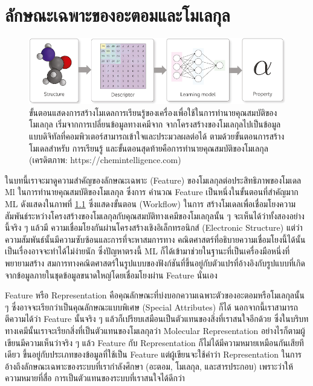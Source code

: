 

\chapter{ลักษณะเฉพาะของอะตอมและโมเลกุล}
\label{ch:feature}

\begin{figure}[htbp]
    \centering
    \includegraphics[width=\linewidth]{fig/workflow_chem_ml.png}
    \caption{ขั้นตอนแสดงการสร้างโมเดลการเรียนรู้ของเครื่องเพื่อใช้ในการทำนายคุณสมบัติของโมเลกุล เริ่มจากการเปลี่ยนข้อมูลทางเคมีจาก%
    จากโครงสร้างของโมเลกุลไปเป็นข้อมูลแบบดิจิทัลที่คอมพิวเตอร์สามารถเข้าใจและประมวลผลต่อได้ ตามด้วยขั้นตอนการสร้างโมเดลสำหรับ%
    การเรียนรู้ และขั้นตอนสุดท้ายคือการทำนายคุณสมบัติของโมเลกุล (เครดิตภาพ: https://chemintelligence.com)}
    \label{fig:workflow_chem_ml}
\end{figure}

ในบทนี้เราจะมาดูความสำคัญของลักษณะเฉพาะ (Feature) ของโมเลกุลต่อประสิทธิภาพของโมเดล Ml ในการทำนายคุณสมบัติของโมเลกุล ซึ่งการ%
คำนวณ Feature เป็นหนึ่งในขั้นตอนที่สำคัญมาก ML ดังแสดงในภาพที่ \ref{fig:workflow_chem_ml} ซึ่งแสดงขั้นตอน (Workflow) ในการ%
สร้างโมเดลเพื่อเชื่อมโยงความสัมพันธ์ระหว่างโครงสร้างของโมเลกุลกับคุณสมบัติทางเคมีของโมเลกุลนั้น ๆ จะเห็นได้ว่าทั้งสองอย่างนี้จริง ๆ แล้วมี%
ความเชื่อมโยงกันผ่านโครงสร้างเชิงอิเล็กทรอนิกส์ (Electronic Structure) แต่ว่าความสัมพันธ์นั้นมีความซับซ้อนและการที่จะหาสมการทาง%
คณิตศาสตร์ที่อธิบายความเชื่อมโยงนี้ได้นั้นเป็นเรื่องอาจจะทำได้ไม่ง่ายนัก ซึ่งปัญหาตรงนี้ ML ก็ได้เข้ามาช่วยในฐานะที่เป็นเครื่องมือหนึ่งที่พยายามสร้าง%
สมการทางคณิตศาสตร์ในรูปแบบของฟังก์ชันที่ขึ้นอยู่กับตัวแปรที่อ้างอิงกับรูปแบบที่เกิดจากข้อมูลภายในชุดข้อมูลขนาดใหญ่โดยเชื่อมโยงผ่าน Feature นั่นเอง

Feature หรือ Representation คือคุณลักษณะที่บ่งบอกความเฉพาะตัวของอะตอมหรือโมเลกุลนั้น ๆ ซึ่งอาจจะเรียกว่าเป็นคุณลักษณะแบบพิเศษ 
(Special Attributes) ก็ได้ นอกจากนี้เราสามารถตีความได้ว่า Feature นั้นจริง ๆ แล้วก็เปรียบเสมือนเป็นตัวแทนของสิ่งที่เราสนใจอีกด้วย 
ซึ่งในบริบททางเคมีนั้นเราจะเรียกสิ่งที่เป็นตัวแทนของโมเลกุลว่า Molecular Representation อย่างไรก็ตามผู้เขียนมีความเห็นว่าจริง ๆ แล้ว 
Feature กับ Representation ก็ไม่ได้มีความหมายเหมือนกันเสียทีเดียว ขึ้นอยู่กับประเภทของข้อมูลที่ใช้เป็น Feature แต่ผู้เขียนจะใช้คำว่า 
Representation ในการอ้างถึงลักษณะเฉพาะของระบบที่เรากำลังศึกษา (อะตอม, โมเลกุล, และสารประกอบ) เพราะว่าให้ความหมายที่สื่อ%
การเป็นตัวแทนของระบบที่เราสนใจได้ดีกว่า\autocite{stepisnik2021}

